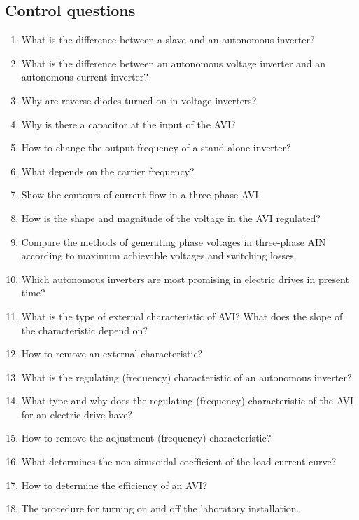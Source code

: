 \documentclass[a4paper,14pt]{article}
\begin{document}
\subsection{Control questions}
\begin{enumerate}
\item What is the difference between a slave and an autonomous inverter?
\item What is the difference between an autonomous voltage inverter and an autonomous current inverter?
\item Why are reverse diodes turned on in voltage inverters?
\item Why is there a capacitor at the input of the AVI?
\item How to change the output frequency of a stand-alone inverter?
\item What depends on the carrier frequency?
\item Show the contours of current flow in a three-phase AVI.
\item How is the shape and magnitude of the voltage in the AVI regulated?
\item Compare the methods of generating phase voltages in three-phase AIN according to maximum achievable voltages and switching losses.
\item Which autonomous inverters are most promising in electric drives in present time?
\item What is the type of external characteristic of AVI? What does the slope of the characteristic depend on?
\item How to remove an external characteristic?
\item What is the regulating (frequency) characteristic of an autonomous inverter?
\item What type and why does the regulating (frequency) characteristic of the AVI for an electric drive have?
\item How to remove the adjustment (frequency) characteristic?
\item What determines the non-sinusoidal coefficient of the load current curve?
\item How to determine the efficiency of an AVI?
\item The procedure for turning on and off the laboratory installation.
\end{enumerate}
\end{document}
